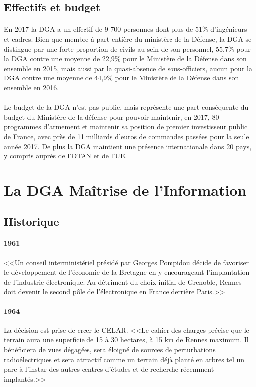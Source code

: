 \documentclass[11pt, book, english, french, standardlists]{upmethodology-document}
\begin{document}
			\subsection{Effectifs et budget}
				\paragraph*{}
					En 2017 la \gls{DGA} a un effectif de 9 700 personnes dont plus de 51\% d'ingénieurs et cadres\cite{PresentationDGA}. Bien que membre à part entière du ministère de la Défense, la \gls{DGA} se distingue par une forte proportion de civils au sein de son personnel, 55,7\% pour la \gls{DGA} contre une moyenne de 22,9\% pour le Ministère de la Défense dans son ensemble en 2015\cite{ChiffresDef2016}, mais aussi par la quasi-absence de sous-officiers, aucun pour la \gls{DGA} contre une moyenne de 44,9\% pour le Ministère de la Défense dans son ensemble en 2016\cite{ChiffresDef2017}.
				\paragraph*{}
					Le budget de la \gls{DGA} n'est pas public, mais représente une part conséquente du budget du Ministère de la défense pour pouvoir maintenir, en 2017, 80 programmes d'armement et maintenir sa position de premier investisseur public de France, avec près de 11 milliards d'euros de commandes passées pour la seule année 2017. De plus la \gls{DGA} maintient une présence internationale dans 20 pays, y compris auprès de l'\gls{OTAN} et de l'\gls{UE}\cite{PresentationDGA}.
		\section{La DGA Maîtrise de l’Information}
			\subsection{Historique}
				\paragraph*{1961}
					<<Un conseil interministériel présidé par Georges Pompidou décide de favoriser le développement de l'économie de la Bretagne en y encourageant l'implantation de l'industrie électronique. Au détriment du choix initial de Grenoble, Rennes doit devenir le second pôle de l'électronique en France derrière Paris.>>\cite{CELAR40ansAvenir}
				\paragraph*{1964}
					La décision est prise de créer le \gls{CELAR}. <<Le cahier des charges précise que le terrain aura une superficie de 15 à 30 hectares, à 15 km de Rennes maximum. Il bénéficiera de vues dégagées, sera éloigné de sources de perturbations radioélectriques et sera attractif comme un terrain déjà planté en arbres tel un parc à l'instar des autres centres d'études et de recherche récemment implantés.>>\cite{CELAR40ansAvenir}
\end{document}
